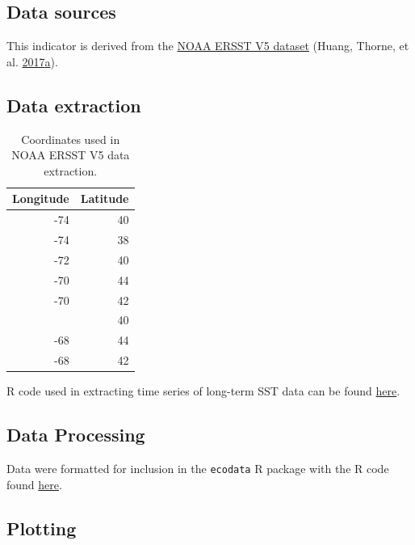 \documentclass[
]{book}
\begin{document}
\hypertarget{data-sources-21}{%
\subsection{Data sources}\label{data-sources-21}}

This indicator is derived from the \href{https://www.esrl.noaa.gov/psd/data/gridded/data.noaa.ersst.v5.html}{NOAA ERSST V5 dataset} (Huang, Thorne, et al. \protect\hyperlink{ref-Huang2017}{2017}\protect\hyperlink{ref-Huang2017}{a}).

\hypertarget{data-extraction-19}{%
\subsection{Data extraction}\label{data-extraction-19}}

\begin{table}

\caption{\label{tab:coordinates}Coordinates used in NOAA ERSST V5 data extraction.}
\centering
\begin{tabular}[t]{rr}
\toprule
Longitude & Latitude\\
\midrule
-74 & 40\\
-74 & 38\\
-72 & 40\\
-70 & 44\\
-70 & 42\\
\addlinespace
-70 & 40\\
-68 & 44\\
-68 & 42\\
\bottomrule
\end{tabular}
\end{table}

R code used in extracting time series of long-term SST data can be found \href{https://github.com/NOAA-EDAB/tech-doc/tree/master/R/stored_scripts/long-term-sst-extraction.R}{here}.

\hypertarget{data-processing-16}{%
\subsection{Data Processing}\label{data-processing-16}}

Data were formatted for inclusion in the \texttt{ecodata} R package with the R code found \href{https://github.com/NOAA-EDAB/ecodata/blob/master/data-raw/get_long_term_sst.R}{here}.

\hypertarget{plotting-15}{%
\subsection{Plotting}\label{plotting-15}}
\end{document}
